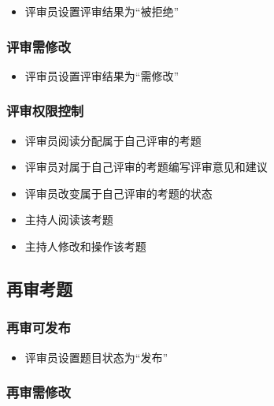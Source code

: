 \documentclass[hyperref, a4paper]{ctexart}
\providecommand{\tightlist}{%
  \setlength{\itemsep}{0pt}\setlength{\parskip}{0pt}}
\begin{document}
\begin{itemize}
\tightlist
\item
  评审员设置评审结果为``被拒绝''
\end{itemize}

\hypertarget{ux8bc4ux5ba1ux9700ux4feeux6539}{%
\subsubsection{评审需修改}\label{ux8bc4ux5ba1ux9700ux4feeux6539}}

\begin{itemize}
\tightlist
\item
  评审员设置评审结果为``需修改''
\end{itemize}

\hypertarget{ux8bc4ux5ba1ux6743ux9650ux63a7ux5236}{%
\subsubsection{评审权限控制}\label{ux8bc4ux5ba1ux6743ux9650ux63a7ux5236}}

\begin{itemize}
\tightlist
\item
  评审员阅读分配属于自己评审的考题
\item
  评审员对属于自己评审的考题编写评审意见和建议
\item
  评审员改变属于自己评审的考题的状态
\item
  主持人阅读该考题
\item
  主持人修改和操作该考题
\end{itemize}

\hypertarget{ux518dux5ba1ux8003ux9898}{%
\subsection{再审考题}\label{ux518dux5ba1ux8003ux9898}}

\hypertarget{ux518dux5ba1ux53efux53d1ux5e03}{%
\subsubsection{再审可发布}\label{ux518dux5ba1ux53efux53d1ux5e03}}

\begin{itemize}
\tightlist
\item
  评审员设置题目状态为``发布''
\end{itemize}

\hypertarget{ux518dux5ba1ux9700ux4feeux6539}{%
\subsubsection{再审需修改}\label{ux518dux5ba1ux9700ux4feeux6539}}
\end{document}
